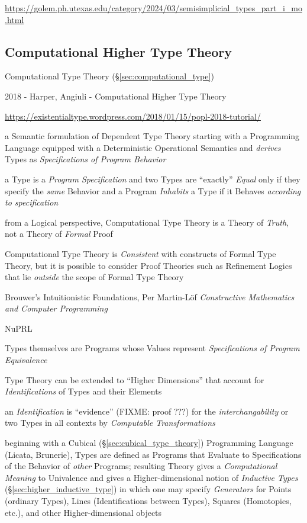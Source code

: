 \url{https://golem.ph.utexas.edu/category/2024/03/semisimplicial_types_part_i_mo.html}



\subsection{Computational Higher Type Theory}
\label{sec:computational_higher_type_theory}

\fist Computational Type Theory (\S\ref{sec:computational_type})

2018 - Harper, Angiuli - Computational Higher Type Theory

\url{https://existentialtype.wordpress.com/2018/01/15/popl-2018-tutorial/}

a Semantic formulation of Dependent Type Theory starting with a Programming
Language equipped with a Deterministic Operational Semantics and \emph{derives}
Types as \emph{Specifications of Program Behavior}

a Type is a \emph{Program Specification} and two Types are ``exactly''
\emph{Equal} only if they specify the \emph{same} Behavior and a Program
\emph{Inhabits} a Type if it Behaves \emph{according to specification}

from a Logical perspective, Computational Type Theory is a Theory of
\emph{Truth}, not a Theory of \emph{Formal} Proof

Computational Type Theory is \emph{Consistent} with constructs of Formal Type
Theory, but it is possible to consider Proof Theories such as Refinement Logics
that lie \emph{outside} the scope of Formal Type Theory

Brouwer's Intuitionistic Foundations, Per Martin-L\"of \emph{Constructive
  Mathematics and Computer Programming}

NuPRL

Types themselves are Programs whose Values represent \emph{Specifications of
  Program Equivalence}

Type Theory can be extended to ``Higher Dimensions'' that account for
\emph{Identifications} of Types and their Elements

an \emph{Identification} is ``evidence'' (FIXME: proof ???) for the
\emph{interchangability} or two Types in all contexts by \emph{Computable
  Transformations}

beginning with a Cubical (\S\ref{sec:cubical_type_theory}) Programming Language
(Licata, Brunerie), Types are defined as Programs that Evaluate to
Specifications of the Behavior of \emph{other} Programs; resulting Theory gives
a \emph{Computational Meaning} to Univalence and gives a Higher-dimensional
notion of \emph{Inductive Types} (\S\ref{sec:higher_inductive_type}) in which
one may specify \emph{Generators} for Points (ordinary Types), Lines
(Identifications between Types), Squares (Homotopies, etc.), and other
Higher-dimensional objects

